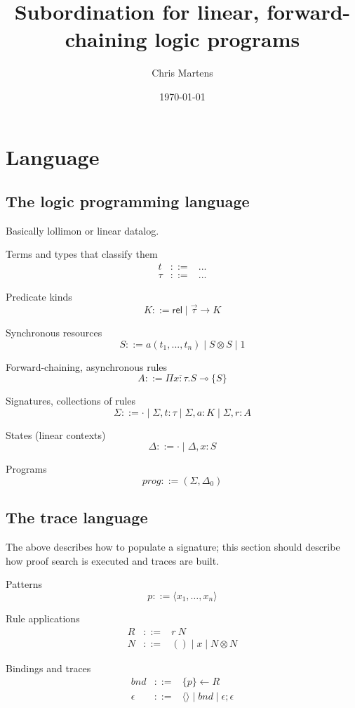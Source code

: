 \documentclass{article}
\title{Subordination for linear, forward-chaining logic programs}
\author{Chris Martens}
\date{\today}
\newcommand{\lolli}{\multimap}
\newcommand{\tensor}{\otimes}
\newcommand{\one}{\mathrm{1}}
\newcommand{\eps}{\epsilon}
\newcommand{\bnd}{\mathit{bnd}}
\newcommand{\nileps}{\langle\rangle}
\begin{document}
\maketitle

\section{Language}

\subsection{The logic programming language}

Basically lollimon or linear datalog.

Terms and types that classify them
\begin{eqnarray*}
t &::=& ... \\
\tau &::=& ...
\end{eqnarray*}

Predicate kinds
\[ K ::= \mathsf{rel} \mid \vec{\tau} \to K \]

Synchronous resources
\[ S ::= a(t_1, ..., t_n) \mid S \tensor S \mid \one \]

Forward-chaining, asynchronous rules
\[ A ::= \Pi \overline{x{:}\tau}. S \lolli \{S\} \]

Signatures, collections of rules
\[ \Sigma 
::= \cdot \mid \Sigma, t : \tau \mid \Sigma, a : K \mid \Sigma, r : A \]

States (linear contexts)
\[
\Delta ::= \cdot \mid \Delta, x : S
\]

Programs
\[
prog ::= (\Sigma, \Delta_0)
\]

\subsection{The trace language}

The above describes how to populate a signature; this section should
describe how proof search is executed and traces are built.

Patterns
\[ p ::= \langle x_1, \dots, x_n \rangle \]

Rule applications
\begin{eqnarray*}
R &::=& r\ N \\
N &::=& () \mid x \mid N\tensor N
\end{eqnarray*}

Bindings and traces
\begin{eqnarray*}
\bnd &::=&  \{ p \} \gets R  \\
\eps &::=& \nileps \mid bnd \mid \eps;\eps
\end{eqnarray*}
\end{document}
